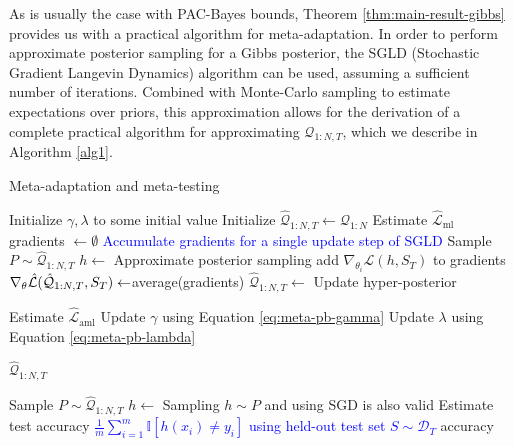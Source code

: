 \documentclass{article}
\theoremstyle{definition}
\newcommand{\LFe}[1]{\textcolor{blue}{#1}}
\begin{document}
As is usually the case with PAC-Bayes bounds, Theorem \ref{thm:main-result-gibbs} provides us with a practical algorithm for meta-adaptation. In order to perform approximate posterior sampling for a Gibbs posterior, the SGLD (Stochastic Gradient Langevin Dynamics) algorithm \citep{Welling2011} can be used, assuming a sufficient number of iterations.
Combined with Monte-Carlo sampling to estimate expectations over priors, 
this approximation allows for the derivation of a complete practical algorithm for approximating $\mathcal{Q}_{1:N,T}$, which we describe in Algorithm \ref{alg1}. 

\begin{algorithm}[H]
	\caption{Meta-adaptation and meta-testing}
	\label{alg1}
	\small
	\begin{algorithmic}
		\State Initialize $\gamma, \lambda$ to some initial value 
		\State Initialize $\hat{\mathcal{Q}}_{1:N, T}\leftarrow \mathcal{Q}_{1:N}$
		\State Estimate $\hat{\mathcal{L}}_{\mathrm{ml}}$
			\State gradients $\leftarrow \emptyset$ \Comment \LFe{Accumulate gradients for a single update step of SGLD}
				\State Sample $P\sim \hat{\mathcal{Q}}_{1:N, T}$
				\State $h\leftarrow$  \Comment Approximate posterior sampling
				\State add $\nabla_{\theta_i} \hat{\mathcal{L}}(h, S_T)$ to gradients
			\EndFor
			\State $\nabla_\theta \hat{\mathcal{L}}(\hat{\cal Q}_{1:N,T}, S_T)\leftarrow$average(gradients)
			\State $\hat{\mathcal{Q}}_{1:N, T}\leftarrow$  \Comment Update hyper-posterior
			
			\State Estimate $\hat{\mathcal{L}}_{\mathrm{aml}}$
			\State Update $\gamma$ using Equation \ref{eq:meta-pb-gamma}
			\State Update $\lambda$ using Equation \ref{eq:meta-pb-lambda}
			
		\EndWhile
		\State \Return $\hat{\mathcal{Q}}_{1:N, T}$
		\EndFunction
		
		\State Sample $P\sim \hat{\mathcal{Q}}_{1:N, T}$
		\State $h\leftarrow$  \Comment Sampling $h\sim P$ and using SGD is also valid
		\State Estimate test accuracy \LFe{$\frac{1}{m}\sum_{i=1}^{m}\mathbb{I}\left [h(x_i)\neq y_i\right ]$ using held-out test set $S\sim \mathcal{D}_T$}
		\State \Return accuracy
		\EndFunction
	\end{algorithmic}
\end{algorithm}
\end{document}
